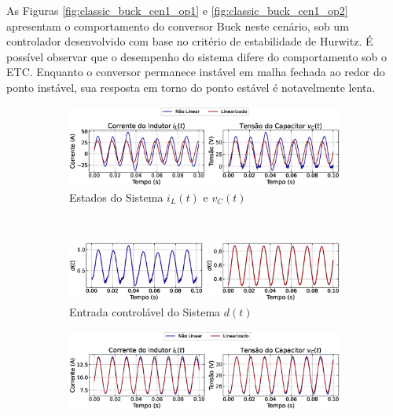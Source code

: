 As Figuras \ref{fig:classic_buck_cen1_op1} e \ref{fig:classic_buck_cen1_op2} apresentam o comportamento do conversor Buck neste cenário, sob um controlador desenvolvido com base no critério de estabilidade de Hurwitz. É possível observar que o desempenho do sistema difere do comportamento sob o ETC. Enquanto o conversor permanece instável em malha fechada ao redor do ponto instável, sua resposta em torno do ponto estável é notavelmente lenta.

\begin{figure}[H]
  \centering
  \captionsetup{justification=centering}
  \begin{subfigure}{1.\textwidth}
    \centering
    \includegraphics[width=1.\textwidth]{figuras/classic/buck/sim1/op1/result.eps}
    \caption{Estados do Sistema $i_L(t)$  e $v_C(t)$}
  \end{subfigure}
  \\[6pt]
  \begin{subfigure}{1.\textwidth}
    \centering
    \includegraphics[width=1.\textwidth]{figuras/classic/buck/sim1/op1/duty-cycle.eps}
    \caption{Entrada controlável do Sistema $d(t)$}
  \end{subfigure}
  \caption{Conversor Buck no Cenário 1 operando em torno de $P_{\mathrm{o}, 1}$ sob controlador projetado utilizando o critério de estabilidade de Hurwitz.}
  \label{fig:classic_buck_cen1_op1}
  \begin{subfigure}{1.\textwidth}
    \centering
    \includegraphics[width=1.\textwidth]{figuras/classic/buck/sim1/op2/result.eps}

\end{subfigure}
\end{figure}
